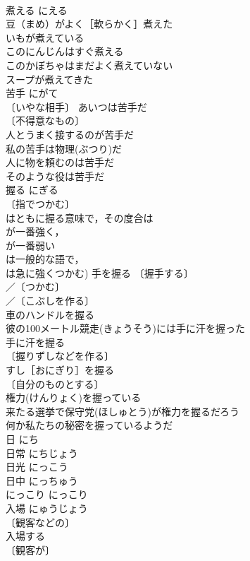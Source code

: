 \documentclass[8pt]{extreport}
\begin{document}
\begin{CJK}{UTF8}{min}
\\	煮える	にえる	
\\	豆（まめ）がよく［軟らかく］煮えた 
\\	いもが煮えている 
\\	このにんじんはすぐ煮える 
\\	このかぼちゃはまだよく煮えていない 
\\	スープが煮えてきた 
\\	苦手	にがて	
\\	〔いやな相手〕 あいつは苦手だ 
\\	〔不得意なもの〕
\\	人とうまく接するのが苦手だ 
\\	私の苦手は物理(ぶつり)だ 
\\	人に物を頼むのは苦手だ 
\\	そのような役は苦手だ 
\\	握る	にぎる	
\\	〔指でつかむ〕
\\	はともに握る意味で，その度合は
\\	が一番強く，
\\	が一番弱い
\\	は一般的な語で，
\\	は急に強くつかむ) 手を握る 〔握手する〕
\\	／〔つかむ〕
\\	／〔こぶしを作る〕
\\	車のハンドルを握る 
\\	彼の100メートル競走(きょうそう)には手に汗を握った 
\\	手に汗を握る　
\\	〔握りずしなどを作る〕　
\\	すし［おにぎり］を握る 
\\	〔自分のものとする〕　
\\	権力(けんりょく)を握っている 
\\	来たる選挙で保守党(ほしゅとう)が権力を握るだろう 
\\	何か私たちの秘密を握っているようだ 
\\	日	にち	
\\	日常	にちじょう	
\\	日光	にっこう	
\\	日中	にっちゅう	
\\	にっこり	にっこり	
\\	入場	にゅうじょう	
\\	〔観客などの〕
\\	入場する 
\\	〔観客が〕

\end{CJK}
\end{document}
